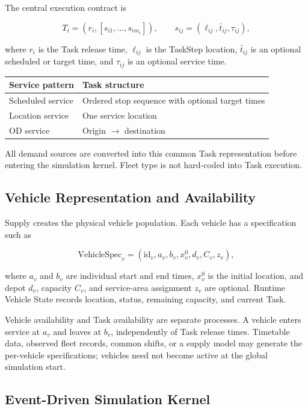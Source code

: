 \documentclass[11pt,a4paper]{article}
\begin{document}
The central execution contract is

\[
T_i=\left(r_i,[s_{i1},\ldots,s_{im_i}]\right),
\qquad
s_{ij}=\left(\ell_{ij},\bar t_{ij},\tau_{ij}\right),
\]

where $r_i$ is the Task release time, $\ell_{ij}$ is the TaskStep location, $\bar t_{ij}$ is an optional scheduled or target time, and $\tau_{ij}$ is an optional service time.

\begin{center}
\small
\begin{tabularx}{0.84\textwidth}{@{}lY@{}}
\toprule
\textbf{Service pattern} & \textbf{Task structure} \\
\midrule
Scheduled service & Ordered stop sequence with optional target times \\
Location service & One service location \\
OD service & Origin $\rightarrow$ destination \\
\bottomrule
\end{tabularx}
\end{center}

All demand sources are converted into this common Task representation before entering the simulation kernel. Fleet type is not hard-coded into Task execution.

\subsection{Vehicle Representation and Availability}

Supply creates the physical vehicle population. Each vehicle has a specification such as

\[
\mathrm{VehicleSpec}_v=
(\mathrm{id}_v,a_v,b_v,x_v^0,d_v,C_v,z_v),
\]

where $a_v$ and $b_v$ are individual start and end times, $x_v^0$ is the initial location, and depot $d_v$, capacity $C_v$, and service-area assignment $z_v$ are optional. Runtime Vehicle State records location, status, remaining capacity, and current Task.

Vehicle availability and Task availability are separate processes. A vehicle enters service at $a_v$ and leaves at $b_v$, independently of Task release times. Timetable data, observed fleet records, common shifts, or a supply model may generate the per-vehicle specifications; vehicles need not become active at the global simulation start.

\subsection{Event-Driven Simulation Kernel}
\end{document}
